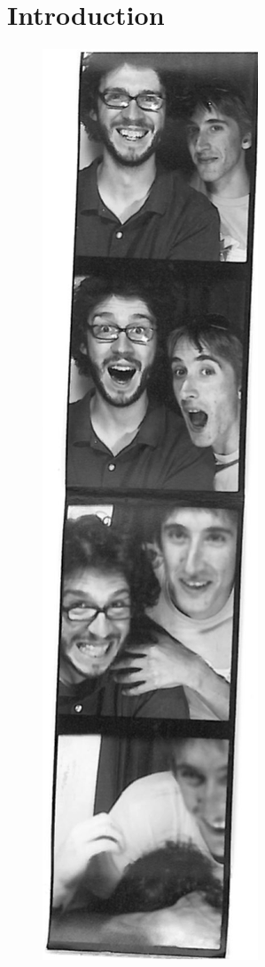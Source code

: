 \graphicspath{{Chapters/Introduction/Figures/}}

\chapter{Introduction}
\label{chap:Introduction}

\begin{figure}[htb]
\includegraphics{test2.png}
\end{figure}
